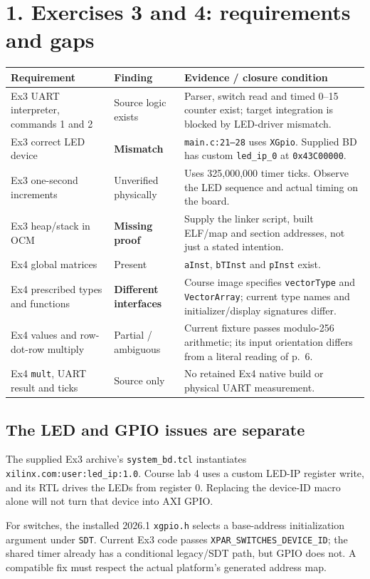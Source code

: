 \documentclass[11pt,a4paper]{article}
\begin{document}
\section*{1. Exercises 3 and 4: requirements and gaps}
\small
\begin{tabularx}{\linewidth}{P{2.8cm} P{2.6cm} Y}
\toprule Requirement & Finding & Evidence / closure condition \\
\midrule
Ex3 UART interpreter, commands 1 and 2 & Source logic exists & Parser, switch read and timed 0--15 counter exist; target integration is blocked by LED-driver mismatch. \\
Ex3 correct LED device & \textbf{Mismatch} & \texttt{main.c:21--28} uses \texttt{XGpio}. Supplied BD has custom \texttt{led\_ip\_0} at \texttt{0x43C00000}. \\
Ex3 one-second increments & Unverified physically & Uses 325,000,000 timer ticks. Observe the LED sequence and actual timing on the board. \\
Ex3 heap/stack in OCM & \textbf{Missing proof} & Supply the linker script, built ELF/map and section addresses, not just a stated intention. \\
Ex4 global matrices & Present & \texttt{aInst}, \texttt{bTInst} and \texttt{pInst} exist. \\
Ex4 prescribed types and functions & \textbf{Different interfaces} & Course image specifies \texttt{vectorType} and \texttt{VectorArray}; current type names and initializer/display signatures differ. \\
Ex4 values and row-dot-row multiply & Partial / ambiguous & Current fixture passes modulo-256 arithmetic; its input orientation differs from a literal reading of p.~6. \\
Ex4 \texttt{mult}, UART result and ticks & Source only & No retained Ex4 native build or physical UART measurement. \\
\bottomrule
\end{tabularx}
\normalsize

\subsection*{The LED and GPIO issues are separate}
The supplied Ex3 archive's \texttt{system\_bd.tcl} instantiates
\texttt{xilinx.com:user:led\_ip:1.0}. Course lab 4 uses a custom LED-IP register
write, and its RTL drives the LEDs from register 0. Replacing the device-ID
macro alone will not turn that device into AXI GPIO.

For switches, the installed 2026.1 \texttt{xgpio.h} selects a base-address
initialization argument under \texttt{SDT}. Current Ex3 code passes
\texttt{XPAR\_SWITCHES\_DEVICE\_ID}; the shared timer already has a conditional
legacy/SDT path, but GPIO does not. A compatible fix must respect the actual
platform's generated address map.
\end{document}
